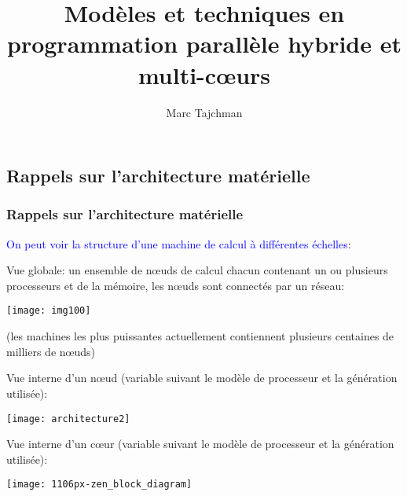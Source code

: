 \documentclass{beamer}
\title{Modèles et techniques en programmation parallèle hybride et multi-c\oe urs}
\author{Marc Tajchman}\institute{CEA - DEN/DM2S/STMF/LMES}
\begin{document}
\begin{frame}
\titlepage
\end{frame}

\Large
\begin{frame}
  	\tableofcontents
\end{frame}

\begin{frame}
\section{Rappels sur l'architecture mat\'erielle}
\frametitle{Rappels sur l'architecture mat\'erielle}
\textcolor{blue}{On peut voir la structure d'une machine de calcul \`a diff\'erentes \'echelles}:
\vfill

Vue globale: un ensemble de n\oe uds de calcul chacun contenant un ou plusieurs processeurs et de la m\'emoire, les n\oe uds sont connect\'es par un r\'eseau:

\vfill
\begin{center}
\texttt{[image: img100]}
\end{center}

(les machines les plus puissantes actuellement contiennent plusieurs centaines de milliers de n\oe uds)
\end{frame}

\begin{frame}
Vue interne d'un n\oe ud (variable suivant le mod\`ele de processeur et la g\'en\'eration utilis\'ee):

\begin{center}
\texttt{[image: architecture2]}
\end{center}

\end{frame}

\begin{frame}
Vue interne d'un c\oe ur (variable suivant le mod\`ele de processeur et la g\'en\'eration utilis\'ee):

\begin{center}
	\texttt{[image: 1106px-zen\_block\_diagram]}
\end{center}

\end{frame}
\end{document}

